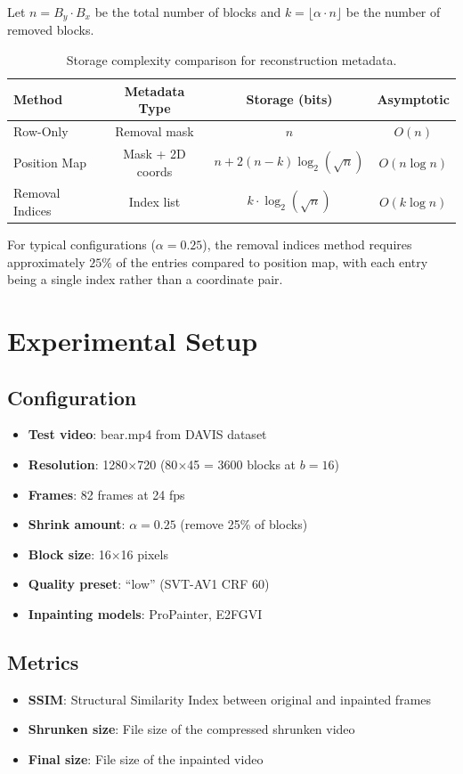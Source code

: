 \documentclass[11pt,a4paper]{article}
\begin{document}
Let $n = B_y \cdot B_x$ be the total number of blocks and $k = \lfloor \alpha \cdot n \rfloor$ be the number of removed blocks.

\begin{table}[h]
\centering
\begin{tabular}{lccc}
\toprule
\textbf{Method} & \textbf{Metadata Type} & \textbf{Storage (bits)} & \textbf{Asymptotic} \\
\midrule
Row-Only & Removal mask & $n$ & $O(n)$ \\
Position Map & Mask + 2D coords & $n + 2(n-k)\log_2(\sqrt{n})$ & $O(n \log n)$ \\
Removal Indices & Index list & $k \cdot \log_2(\sqrt{n})$ & $O(k \log n)$ \\
\bottomrule
\end{tabular}
\caption{Storage complexity comparison for reconstruction metadata.}
\label{tab:storage}
\end{table}

For typical configurations ($\alpha = 0.25$), the removal indices method requires approximately $25\%$ of the entries compared to position map, with each entry being a single index rather than a coordinate pair.

\section{Experimental Setup}

\subsection{Configuration}
\begin{itemize}
    \item \textbf{Test video}: bear.mp4 from DAVIS dataset
    \item \textbf{Resolution}: 1280$\times$720 (80$\times$45 = 3600 blocks at $b=16$)
    \item \textbf{Frames}: 82 frames at 24 fps
    \item \textbf{Shrink amount}: $\alpha = 0.25$ (remove 25\% of blocks)
    \item \textbf{Block size}: 16$\times$16 pixels
    \item \textbf{Quality preset}: ``low'' (SVT-AV1 CRF 60)
    \item \textbf{Inpainting models}: ProPainter, E2FGVI
\end{itemize}

\subsection{Metrics}
\begin{itemize}
    \item \textbf{SSIM}: Structural Similarity Index between original and inpainted frames
    \item \textbf{Shrunken size}: File size of the compressed shrunken video
    \item \textbf{Final size}: File size of the inpainted video
\end{itemize}
\end{document}
